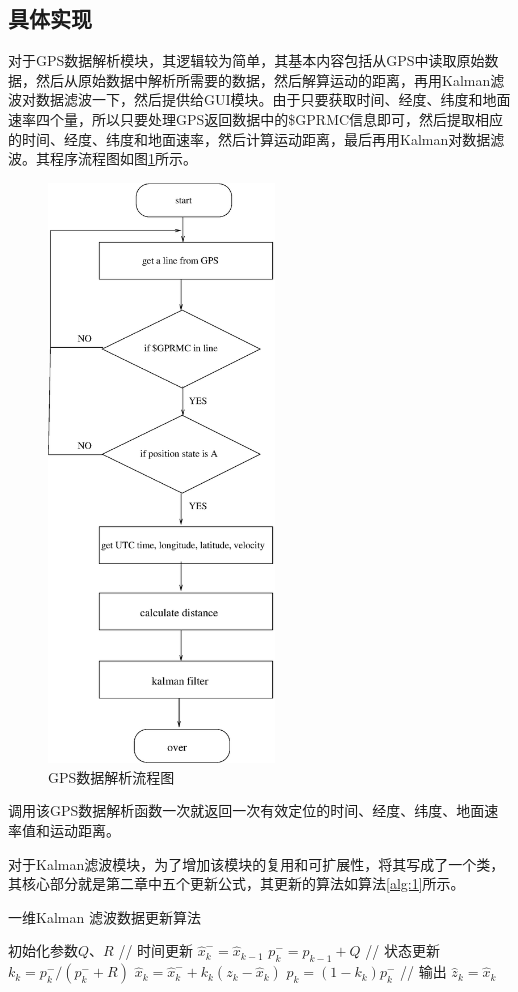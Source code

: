 \documentclass[a4paper, 12pt]{article}
\begin{document}
\subsection{具体实现}
对于GPS数据解析模块，其逻辑较为简单，其基本内容包括从GPS中读取原始数据，然后从原始数据中解析所需要的数据，然后解算运动的距离，再用Kalman滤波对数据滤波一下，然后提供给GUI模块。由于只要获取时间、经度、纬度和地面速率四个量，所以只要处理GPS返回数据中的\$GPRMC信息即可，然后提取相应的时间、经度、纬度和地面速率，然后计算运动距离，最后再用Kalman对数据滤波。其程序流程图如图\ref{fig:1}所示。
\begin{figure}[ht]
  \centering
  \includegraphics[width=6cm]{f1.eps}
  \caption{GPS数据解析流程图}
  \label{fig:1}
\end{figure}
调用该GPS数据解析函数一次就返回一次有效定位的时间、经度、纬度、地面速率值和运动距离。


对于Kalman滤波模块，为了增加该模块的复用和可扩展性，将其写成了一个类，其核心部分就是第二章中五个更新公式，其更新的算法如算法\ref{alg:1}所示。
\begin{algorithm}[ht]
\caption{一维Kalman 滤波数据更新算法}
\label{alg:1}
初始化参数$Q$、$R$\;
{
  // 时间更新\;
  $\hat{x}_k^- = \hat{x}_{k-1}$\;
  $p_k^- = p_{k-1} + Q$\;
  // 状态更新\;
  $k_k = p_k^-/(p_k^- + R)$\;
  $\hat{x}_k = \hat{x}_k^-+k_k(z_k-\hat{x}_k)$\;
  $p_k = (1-k_k)p_k^-$\;
  // 输出\;
  $\hat{z}_k = \hat{x}_k$\;
}
\end{algorithm}
\end{document}
